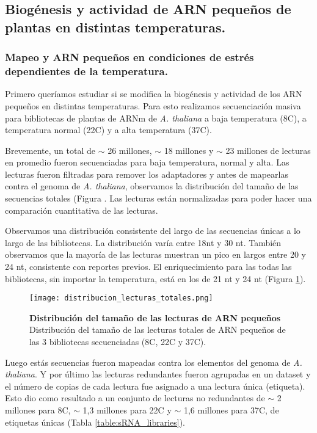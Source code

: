 \subsection{Biogénesis y actividad de ARN pequeños de plantas en distintas temperaturas.}

\subsubsection{Mapeo y ARN pequeños en condiciones de estrés dependientes de la temperatura.}

Primero queríamos estudiar si se modifica la biogénesis y actividad de los ARN pequeños en distintas temperaturas.
Para esto realizamos secuenciación masiva para bibliotecas de plantas de ARNm de \textit{A. thaliana} a baja temperatura (8\degree C), a temperatura normal (22\degree C) y a alta temperatura (37\degree C).

Brevemente, un total de $\sim$ 26 millones, $\sim$ 18 millones y $\sim$ 23 millones de lecturas en promedio fueron secuenciadas para baja temperatura, normal y alta.
Las lecturas fueron filtradas para remover los adaptadores y antes de mapearlas contra el genoma de \textit{A. thaliana}, observamos la distribución del tamaño de las secuencias totales (Figura \label{fig:distribucion_lecturas_totales}.
Las lecturas están normalizadas para poder hacer una comparación cuantitativa de las lecturas.

Observamos una distribución consistente del largo de las secuencias únicas a lo largo de las bibliotecas.
La distribución varía entre 18nt y 30 nt.
También observamos que la mayoría de las lecturas muestran un pico en largos entre 20 y 24 nt, consistente con reportes previos.
El enriquecimiento para las todas las bibliotecas, sin importar la temperatura, está en los de 21 nt y 24 nt (Figura \ref{fig:distribucion_lecturas_totales}).

\begin{figure}[htbp!] 
    \centering    
    \texttt{[image: distribucion\_lecturas\_totales.png]}
    \caption[Distribución del tamaño de las lecturas totales de ARN pequeños]{
    \textbf{Distribución del tamaño de las lecturas de ARN pequeños}
    Distribución del tamaño de las lecturas totales de ARN pequeños de las 3 bibliotecas secuenciadas (8\degree C, 22\degree C y 37\degree C).
   }
     \label{fig:distribucion_lecturas_totales}
\end{figure}

Luego estás secuencias fueron mapeadas contra los elementos del genoma de \textit{A. thaliana}.
Y por último las lecturas redundantes fueron agrupadas en un dataset y el número de copias de cada lectura fue asignado a una lectura única (etiqueta).
Esto dio como resultado a un conjunto de lecturas no redundantes de $\sim$ 2 millones para 8\degree C, $\sim$ 1,3 millones para 22\degree C y $\sim$ 1,6 millones para 37\degree C, de etiquetas únicas (Tabla \ref{table:sRNA_libraries}).

